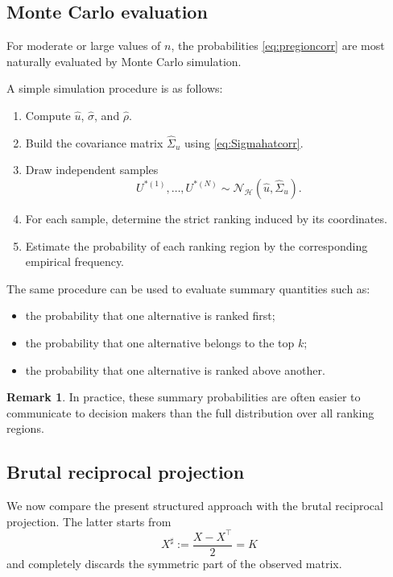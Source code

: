 \documentclass[11pt]{amsart}
\theoremstyle{definition}
\newtheorem{remark}[definition]{Remark}
\theoremstyle{plain}
\numberwithin{equation}{section}
\begin{document}
\subsection{Monte Carlo evaluation}

For moderate or large values of $n$, the probabilities \eqref{eq:pregioncorr} are most naturally evaluated by Monte Carlo simulation.

A simple simulation procedure is as follows:
\begin{enumerate}[label=\textup{Step \arabic*.}]
\item Compute $\widehat u$, $\widehat\sigma$, and $\widehat\rho$.
\item Build the covariance matrix $\widehat\Sigma_u$ using \eqref{eq:Sigmahatcorr}.
\item Draw independent samples
\[
U^{\ast(1)},\dots,U^{\ast(N)}\sim \mathcal N_{\mathcal H}(\widehat u,\widehat\Sigma_u).
\]
\item For each sample, determine the strict ranking induced by its coordinates.
\item Estimate the probability of each ranking region by the corresponding empirical frequency.
\end{enumerate}

The same procedure can be used to evaluate summary quantities such as:
\begin{itemize}
\item the probability that one alternative is ranked first;
\item the probability that one alternative belongs to the top $k$;
\item the probability that one alternative is ranked above another.
\end{itemize}

\begin{remark}
In practice, these summary probabilities are often easier to communicate to decision makers than the full distribution over all ranking regions.
\end{remark}

\subsection{Brutal reciprocal projection}

We now compare the present structured approach with the brutal reciprocal projection. The latter starts from
\[
X^\sharp:=\frac{X-X^\top}{2}=K
\]
and completely discards the symmetric part of the observed matrix.
\end{document}
